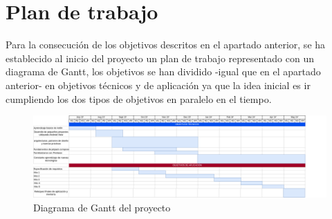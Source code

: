 \section{Plan de trabajo}
Para la consecución de los objetivos descritos en el apartado anterior, se ha establecido al inicio del proyecto un plan de trabajo representado con un diagrama de Gantt, los objetivos se han dividido -igual que en el apartado anterior- en objetivos técnicos y de aplicación ya que la idea inicial es ir cumpliendo los dos tipos de objetivos en paralelo en el tiempo.
\begin{figure}[h]
	\centering
	\includegraphics[width = 1\textwidth]{Imagenes/Bitmap/Gantt_Diagram.png}
	\caption{Diagrama de Gantt del proyecto}
	\label{fig:Gantt}
\end{figure}

